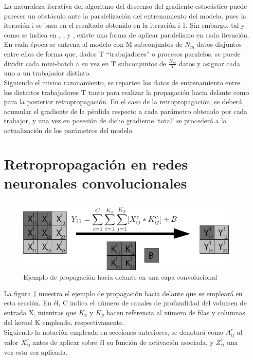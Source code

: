 La naturaleza iterativa del algoritmo del descenso del gradiente estocástico puede parecer un obstáculo ante la paralelización del entrenamiento del modelo, pues la iteración i se basa en el resultado obtenido en la iteración i-1. Sin embargo, tal y como se indica en \cite{CNN_parallel_Stanford}, \cite{CNN_parallel_International_Conference}, y \cite{CNN_parallel_Ome_Weird_Trick}, existe una forma de aplicar paralelismo en cada iteración. \\
En cada época se entrena al modelo con M subconjuntos de $N_m$ datos disjuntos entre ellos de forma que, dados T ``trabajadores'' o procesos paralelos, se puede dividir cada mini-batch a su vez en T subconjuntos de $\frac{N_m}{T}$ datos y asignar cada uno a un trabajador distinto.\\
Siguiendo el mismo razonamiento, se reparten los datos de entrenamiento entre los distintos trabajadores T tanto para realizar la propagación hacia delante como para la posterior retropropagación. En el caso de la retropropagación, se deberá acumular el gradiente de la pérdida respecto a cada parámetro obtenido por cada trabajor, y una vez en posesión de dicho gradiente `total' se procederá a la actualización de los parámetros del modelo.

\section{Retropropagación en redes neuronales convolucionales}

\begin{figure}[H]
	\centering
	\includegraphics[width=0.8\linewidth]{imagenes/conv_ejemplo_backprop_1.jpg} 
	\caption{Ejemplo de propagación hacia delante en una capa convolucional}
	\label{fig:ejemplo_forward_prop_convolucional}
\end{figure}

La figura \ref{fig:ejemplo_forward_prop_convolucional} muestra el ejemplo de propagación hacia delante que se empleará en esta sección. En él, C indica el número de canales de profundidad del volumen de entrada X, mientras que $K_x$ y $K_y$ hacen referencia al número de filas y columnas del kernel K empleado, respectivamente. \\
Siguiendo la notación empleada en secciones anteriores, se denotará como $A^c_{ij}$ al valor $X^c_{ij}$ antes de aplicar sobre él su función de activación asociada, y $Z^c_{ij}$ una vez esta sea aplicada.

